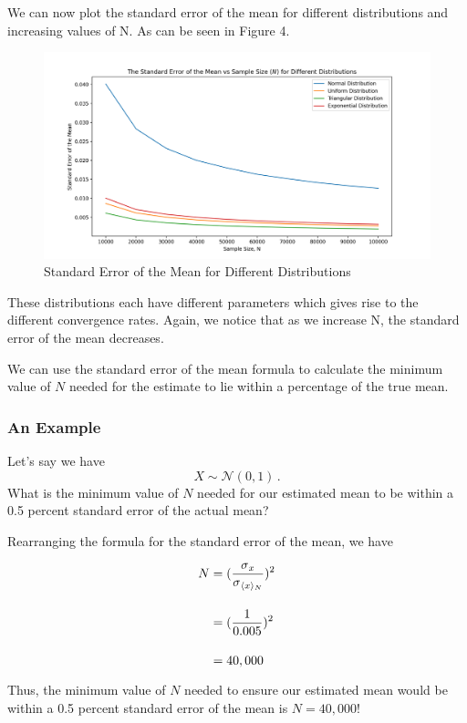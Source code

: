 \documentclass[12pt]{article}
\begin{document}
We can now plot the standard error of the mean for different distributions and increasing values of N. As can be seen in Figure 4. 
 
\begin{figure}[h!]
  \includegraphics[scale=0.45, center]{10,000 to 100,000.png}
  \caption{Standard Error of the Mean for Different Distributions}
  \label{fig:estimated_mean}
\end{figure}

These distributions each have different parameters which gives rise to the different convergence rates. Again, we notice that as we increase N, the standard error of the mean decreases. 

We can use the standard error of the mean formula to calculate the minimum value of $N$ needed for the estimate to lie within a percentage of the true mean.

\subsubsection*{An Example}
Let's say we have \[
  X \sim \mathcal{N}(0,1)\,.
\]
What is the minimum value of $N$ needed for our estimated mean to be within a 0.5 percent standard error of the actual mean?

Rearranging the formula for the standard error of the mean, we have 
 

\begin{align}
N  &= (\frac{\sigma\textsubscript{$x$}}{\sigma\textsubscript{$\langle x\rangle$\textsubscript{$N$}}})^2\\\\
&= (\frac{1}{0.005})^2 \\\\
&= 40,000
\end{align}

Thus, the minimum value of $N$ needed to ensure our estimated mean would be within a 0.5 percent standard error of the mean is $N = 40,000$!
\end{document}
